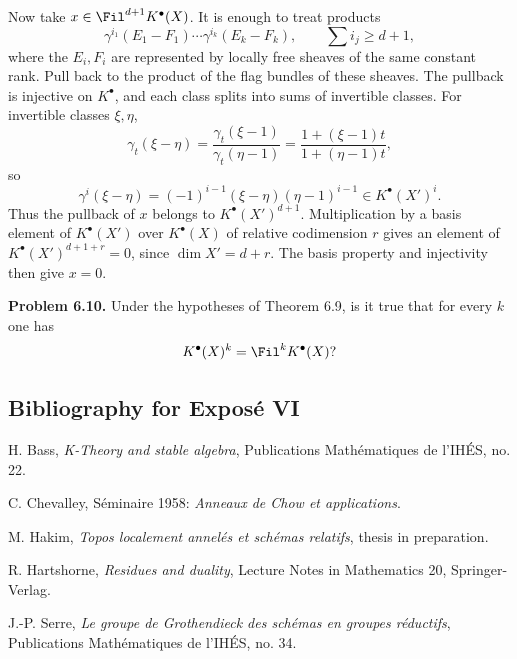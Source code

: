 Now take \(x\in \Fil^{d+1}K^\bullet(X)\). It is enough to treat products
\[
  \gamma^{i_1}(E_1-F_1)\cdots\gamma^{i_k}(E_k-F_k),
  \qquad \sum i_j\geq d+1,
\]
where the \(E_i,F_i\) are represented by locally free sheaves of the same constant rank. Pull back to the product of the flag bundles of these sheaves. The pullback is injective on \(K^\bullet\), and each class splits into sums of invertible classes. For invertible classes \(\xi,\eta\),
\[
  \gamma_t(\xi-\eta)
  =\frac{\gamma_t(\xi-1)}{\gamma_t(\eta-1)}
  =\frac{1+(\xi-1)t}{1+(\eta-1)t},
\]
so
\[
  \gamma^i(\xi-\eta)=(-1)^{i-1}(\xi-\eta)(\eta-1)^{i-1}\in K^\bullet(X')^i.
\]
Thus the pullback of \(x\) belongs to \(K^\bullet(X')^{d+1}\). Multiplication by a basis element of \(K^\bullet(X')\) over \(K^\bullet(X)\) of relative codimension \(r\) gives an element of \(K^\bullet(X')^{d+1+r}=0\), since \(\dim X'=d+r\). The basis property and injectivity then give \(x=0\).

\textbf{Problem 6.10.} Under the hypotheses of Theorem 6.9, is it true that for every \(k\) one has
\[
  K^\bullet(X)^k=\Fil^kK^\bullet(X)?
\]

\subsection*{Bibliography for Exposé VI}
\begin{enumerate}[label={\textup{[\arabic*]}}]
\item H. Bass, \emph{K-Theory and stable algebra}, Publications Mathématiques de l'IHÉS, no. 22.
\item C. Chevalley, Séminaire 1958: \emph{Anneaux de Chow et applications}.
\item M. Hakim, \emph{Topos localement annelés et schémas relatifs}, thesis in preparation.
\item R. Hartshorne, \emph{Residues and duality}, Lecture Notes in Mathematics 20, Springer-Verlag.
\item J.-P. Serre, \emph{Le groupe de Grothendieck des schémas en groupes réductifs}, Publications Mathématiques de l'IHÉS, no. 34.
\end{enumerate}



\providecommand{\Kosz}{\mathrm K}
\providecommand{\Proj}{\operatorname{Proj}}
\providecommand{\Sym}{\operatorname{Sym}}
\providecommand{\gr}{\operatorname{gr}}
\providecommand{\Tor}{\operatorname{Tor}}
\providecommand{\Spec}{\operatorname{Spec}}
\providecommand{\Imf}{\operatorname{Im}}
\providecommand{\Ker}{\operatorname{Ker}}
\providecommand{\Id}{\operatorname{Id}}
\providecommand{\rad}{\operatorname{rad}}
\providecommand{\cO}{\mathcal O}
\providecommand{\cS}{\mathcal S}
\providecommand{\cJ}{\mathcal J}
\providecommand{\cN}{\mathcal N}
\providecommand{\bfP}{\mathbf P}
\providecommand{\bfA}{\mathbf A}


